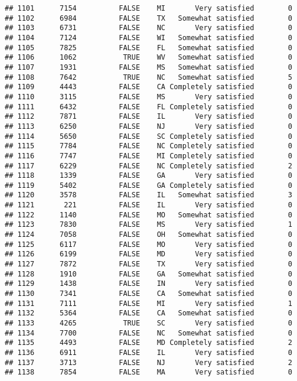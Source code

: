 \documentclass[]{book}
\theoremstyle{definition}
\theoremstyle{definition}
\theoremstyle{remark}
\begin{document}
\begin{verbatim}
## 1101      7154          FALSE    MI       Very satisfied        0
## 1102      6984          FALSE    TX   Somewhat satisfied        0
## 1103      6731          FALSE    NC       Very satisfied        0
## 1104      7124          FALSE    WI   Somewhat satisfied        0
## 1105      7825          FALSE    FL   Somewhat satisfied        0
## 1106      1062           TRUE    WV   Somewhat satisfied        0
## 1107      1931          FALSE    MS   Somewhat satisfied        0
## 1108      7642           TRUE    NC   Somewhat satisfied        5
## 1109      4443          FALSE    CA Completely satisfied        0
## 1110      3115          FALSE    MS       Very satisfied        0
## 1111      6432          FALSE    FL Completely satisfied        0
## 1112      7871          FALSE    IL       Very satisfied        0
## 1113      6250          FALSE    NJ       Very satisfied        0
## 1114      5650          FALSE    SC Completely satisfied        0
## 1115      7784          FALSE    NC Completely satisfied        0
## 1116      7747          FALSE    MI Completely satisfied        0
## 1117      6229          FALSE    NC Completely satisfied        2
## 1118      1339          FALSE    GA       Very satisfied        0
## 1119      5402          FALSE    GA Completely satisfied        0
## 1120      3578          FALSE    IL   Somewhat satisfied        3
## 1121       221          FALSE    IL       Very satisfied        0
## 1122      1140          FALSE    MO   Somewhat satisfied        0
## 1123      7830          FALSE    MS       Very satisfied        1
## 1124      7058          FALSE    OH   Somewhat satisfied        0
## 1125      6117          FALSE    MO       Very satisfied        0
## 1126      6199          FALSE    MD       Very satisfied        0
## 1127      7872          FALSE    TX       Very satisfied        0
## 1128      1910          FALSE    GA   Somewhat satisfied        0
## 1129      1438          FALSE    IN       Very satisfied        0
## 1130      7341          FALSE    CA   Somewhat satisfied        0
## 1131      7111          FALSE    MI       Very satisfied        1
## 1132      5364          FALSE    CA   Somewhat satisfied        0
## 1133      4265           TRUE    SC       Very satisfied        0
## 1134      7700          FALSE    NC   Somewhat satisfied        0
## 1135      4493          FALSE    MD Completely satisfied        2
## 1136      6911          FALSE    IL       Very satisfied        0
## 1137      3713          FALSE    NJ       Very satisfied        2
## 1138      7854          FALSE    MA       Very satisfied        0

\end{verbatim}
\end{document}

